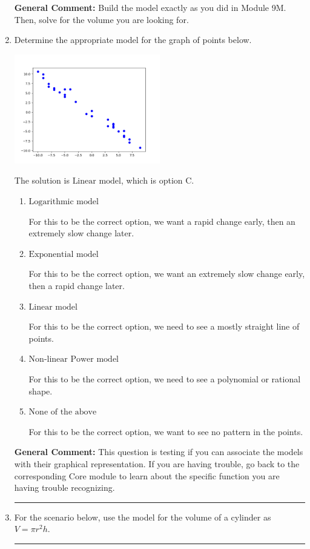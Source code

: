 \documentclass{extbook}[14pt]
\newcommand{\litem}[1]{\item #1

\rule{\textwidth}{0.4pt}}
\begin{document}
\begin{enumerate}
{\textbf{General Comment:} Build the model exactly as you did in Module 9M. Then, solve for the volume you are looking for.
}
\litem{
Determine the appropriate model for the graph of points below.

\begin{center}
    \includegraphics[width=0.5\textwidth]{../Figures/identifyModelGraph12CopyC.png}
\end{center}


The solution is \( \text{Linear model} \), which is option C.\begin{enumerate}[label=\Alph*.]
\item \( \text{Logarithmic model} \)

For this to be the correct option, we want a rapid change early, then an extremely slow change later.
\item \( \text{Exponential model} \)

For this to be the correct option, we want an extremely slow change early, then a rapid change later.
\item \( \text{Linear model} \)

For this to be the correct option, we need to see a mostly straight line of points.
\item \( \text{Non-linear Power model} \)

For this to be the correct option, we need to see a polynomial or rational shape.
\item \( \text{None of the above} \)

For this to be the correct option, we want to see no pattern in the points.
\end{enumerate}

\textbf{General Comment:} This question is testing if you can associate the models with their graphical representation. If you are having trouble, go back to the corresponding Core module to learn about the specific function you are having trouble recognizing.
}
\litem{
For the scenario below, use the model for the volume of a cylinder as $V = \pi r^2 h$.

}
\end{enumerate}
\end{document}
